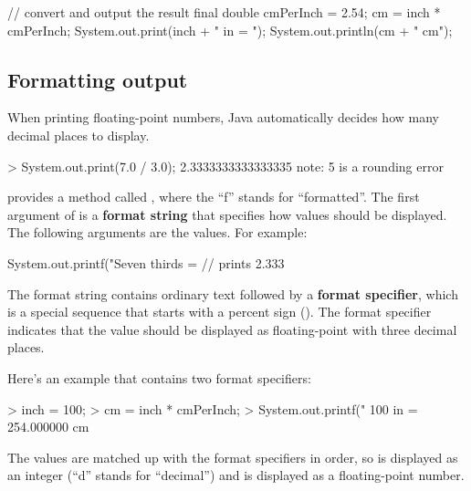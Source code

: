 \begin{code}
    // convert and output the result
    final double cmPerInch = 2.54;
    cm = inch * cmPerInch;
    System.out.print(inch + " in = ");
    System.out.println(cm + " cm");
\end{code}




\subsection{Formatting output}

When printing floating-point numbers, Java automatically decides how many decimal places to display.


\begin{code}
> System.out.print(7.0 / 3.0);
2.3333333333333335   note: 5 is a rounding error
\end{code}


 provides a method called , where the ``f'' stands for ``formatted''.  The first argument of  is a {\bf format string} that specifies how values should be displayed.
The following arguments are the values.
For example:

\begin{code}
    System.out.printf("Seven thirds = %
    // prints 2.333
\end{code}

The format string contains ordinary text followed by a {\bf format specifier}, which is a special sequence that starts with a percent sign (\java{\%}).
The format specifier \java{} indicates that the value should be displayed as floating-point with three decimal places.

Here's an example that contains two format specifiers:

\begin{code}
> inch = 100;
> cm = inch * cmPerInch;
> System.out.printf("%
100 in = 254.000000 cm  
\end{code}

The values are matched up with the format specifiers in order, so 
is displayed as an integer (``d'' stands for ``decimal'') and
 is displayed as a floating-point number.

